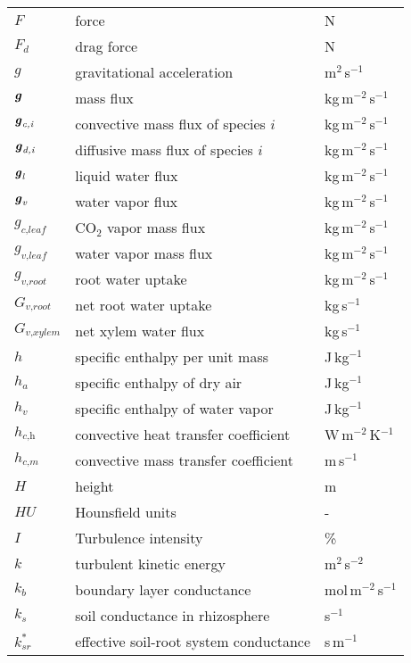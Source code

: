 \begin{longtable}{p{}p{}p{}}
	$F$ & force & N \\	
	$F_d$ & drag force & N \\		
	$g$ & gravitational acceleration & m$^2$\,s$^{-1}$ \\ 
	$\textbf{\textit{g}}$ & mass flux & kg\,m$^{-2}$\,s$^{-1}$ \\ 		
	$\textbf{\textit{g}}_{\textit{c,i}}$ & convective mass flux of species $i$ & kg\,m$^{-2}$\,s$^{-1}$ \\ 			
	$\textbf{\textit{g}}_{\textit{d,i}}$ & diffusive mass flux of species $i$ & kg\,m$^{-2}$\,s$^{-1}$ \\ 				
	$\textbf{\textit{g}}_{\textit{l}}$ & liquid water flux & kg\,m$^{-2}$\,s$^{-1}$ \\ 		
	$\textbf{\textit{g}}_{\textit{v}}$ & water vapor flux & kg\,m$^{-2}$\,s$^{-1}$ \\ 		
	$g_{\textit{c,leaf}}$ & CO$_2$ vapor mass flux & kg\,m$^{-2}$\,s$^{-1}$ \\ 	
	$g_{\textit{v,leaf}}$ & water vapor mass flux & kg\,m$^{-2}$\,s$^{-1}$ \\ 	
	$g_{\textit{v,root}}$ & root water uptake & kg\,m$^{-2}$\,s$^{-1}$ \\ 		
	$G_{\textit{v,root}}$ & net root water uptake & kg\,s$^{-1}$ \\ 		
	$G_{\textit{v,xylem}}$ & net xylem water flux & kg\,s$^{-1}$ \\ 		
	$h$ & specific enthalpy per unit mass & J\,kg$^{-1}$ \\ 
	$h_a$ & specific enthalpy of dry air & J\,kg$^{-1}$ \\ 	
	$h_v$ & specific enthalpy of water vapor & J\,kg$^{-1}$ \\ 		
	$h_{\textit{c,h}}$ & convective heat transfer coefficient & W\,m$^{-2}$\,K$^{-1}$ \\ 
	$h_{\textit{c,m}}$ & convective mass transfer coefficient & m\,s$^{-1}$ \\ 
	$H$ & height & m \\ 
	$HU$ & Hounsfield units & - \\ 
	$I$ & Turbulence intensity & \% \\ 	
	$k$ & turbulent kinetic energy & m$^2$\,s$^{-2}$ \\ 
	$k_b$ & boundary layer conductance & mol\,m$^{-2}$\,s$^{-1}$  \\ 		
	$k_s$ & soil conductance in rhizosphere & s$^{-1}$  \\ 		
	$k_{\textit{sr}}^*$ & effective soil-root system conductance & s\,m$^{-1}$  \\ 	


\end{longtable}
